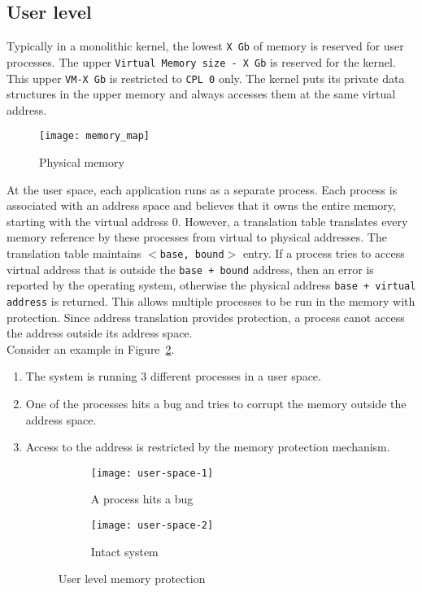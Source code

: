 \subsection{User level}
\label{subsec:user level}
Typically in a monolithic kernel, the lowest \texttt{X Gb} of memory is reserved for user processes. The upper \texttt{Virtual Memory size - X Gb} is reserved for the kernel. This upper \texttt{VM-X Gb} is restricted to \texttt{CPL 0} only. The kernel puts its private data structures in the upper memory and always accesses them at the same virtual address. 
\begin{figure}[!ht]
\centering
\texttt{[image: memory\_map]}
\caption{Physical memory}
\label{fig:memmap}
\end{figure}
At the user space, each application runs as a separate process. Each process is associated with an address space and believes that it owns the entire memory, starting with the virtual address 0. However, a translation table translates every memory reference by these processes from virtual to physical addresses. The translation table maintains \texttt{$<$base, bound$>$} entry. If a process tries to access virtual address that is outside the \texttt{base + bound} address, then an error is reported by the operating system, otherwise the physical address \texttt{base + virtual address} is returned. This allows multiple processes to be run in the memory with protection. Since address translation provides protection, a process canot access the address outside its address space.
\\[3mm]
Consider an example in Figure~\ref{fig:User space}.
\begin{enumerate}
\item The system is running 3 different processes in a user space.
\item One of the processes hits a bug and tries to corrupt the memory outside the address space.
\item Access to the address is restricted by the memory protection mechanism.
\begin{figure}[!ht]
    \centering
    \begin{subfigure}[b]{0.49\textwidth}
	\texttt{[image: user-space-1]}
	\caption{A process hits a bug}
    \end{subfigure}
	\hfill
    \begin{subfigure}[b]{0.49\textwidth}
	\texttt{[image: user-space-2]}
	\caption{Intact system}
    \end{subfigure}
    \caption{User level memory protection}\label{fig:User space}
\end{figure}
\end{enumerate}

